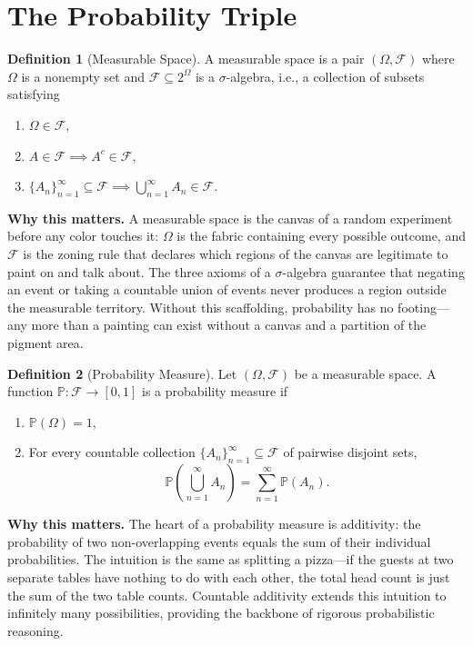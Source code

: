 \documentclass[11pt,a4paper,openany]{book}
\theoremstyle{definition}
\newtheorem{definition}{Definition}[chapter]
\theoremstyle{plain}
\theoremstyle{remark}
\newcommand{\1}{\mathbbm{1}}
\newcommand{\F}{\mathcal{F}}
\newcommand{\Pbb}{\mathbb{P}}
\begin{document}
\section{The Probability Triple}

\begin{definition}[Measurable Space]
A measurable space is a pair $(\Omega, \F)$ where $\Omega$ is a nonempty set and $\F \subseteq 2^{\Omega}$ is a $\sigma$-algebra, i.e., a collection of subsets satisfying
\begin{enumerate}[label=(\arabic*)]
    \item $\Omega \in \F$,
    \item $A \in \F \implies A^{c} \in \F$,
    \item $\{A_{n}\}_{n=1}^{\infty} \subseteq \F \implies \bigcup_{n=1}^{\infty} A_{n} \in \F$.
\end{enumerate}
\end{definition}

\medskip
\noindent\textbf{Why this matters.} A measurable space is the canvas of a random experiment before any color touches it: $\Omega$ is the fabric containing every possible outcome, and $\mathcal{F}$ is the zoning rule that declares which regions of the canvas are legitimate to paint on and talk about. The three axioms of a $\sigma$-algebra guarantee that negating an event or taking a countable union of events never produces a region outside the measurable territory. Without this scaffolding, probability has no footing---any more than a painting can exist without a canvas and a partition of the pigment area.

\begin{definition}[Probability Measure]
Let $(\Omega, \F)$ be a measurable space. A function $\Pbb: \F \to [0,1]$ is a probability measure if
\begin{enumerate}[label=(\arabic*)]
    \item $\Pbb(\Omega) = 1$,
    \item For every countable collection $\{A_{n}\}_{n=1}^{\infty} \subseteq \F$ of pairwise disjoint sets,
    \[
    \Pbb\left(\bigcup_{n=1}^{\infty} A_{n}\right) = \sum_{n=1}^{\infty} \Pbb(A_{n}).
    \]
\end{enumerate}
\end{definition}

\medskip
\noindent\textbf{Why this matters.} The heart of a probability measure is additivity: the probability of two non-overlapping events equals the sum of their individual probabilities. The intuition is the same as splitting a pizza---if the guests at two separate tables have nothing to do with each other, the total head count is just the sum of the two table counts. Countable additivity extends this intuition to infinitely many possibilities, providing the backbone of rigorous probabilistic reasoning.
\end{document}
